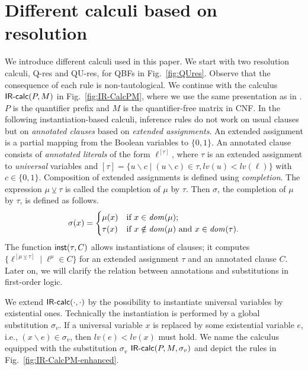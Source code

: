 \documentclass{llncs}
\newcommand{\qres}{\mbox{\sf Q-res}}
\newcommand{\qures}{\mbox{\sf QU-res}}
\newcommand{\IRcalcPM}[2]{$\mbox{\sf IR-calc}(#1,#2)$}
\newcommand{\IRcalcPMSubst}[3]{$\mbox{\sf IR-calc}(#1,#2,#3)$}
\newcommand{\InstOp}[2]{$\mbox{\sf inst}(#1,#2)$}
\newcommand{\dom}[1]{\ensuremath\mathit{dom}(#1)}
\newcommand{\complassign}{\ensuremath{\veebar}}
\newcommand{\is}{\ensuremath{\backslash}}
\newcommand{\restrict}[1]{\ensuremath{[#1]}}
\newcommand{\level}[1]{{\mathit lv(#1)}}
\begin{document}
\section{Different calculi based on resolution}\label{sec:res-calculi}
We introduce different calculi used in this paper.  We start with two
resolution calculi, \qres{} and \qures, for QBFs in
Fig.~\ref{fig:QUres}.  Observe that the consequence of each 
rule is non-tautological.  We continue with the calculus
\IRcalcPM{P}{M}{} in Fig.~\ref{fig:IR-CalcPM}, where we use the same
presentation as in \cite{DBLP:conf/mfcs/BeyersdorffCJ14}.  $P$ is the
quantifier prefix and $M$ is the quantifier-free matrix in CNF. In 
the following instantiation-based calculi, inference rules do not work
on usual clauses but on \emph{annotated clauses} based on
\emph{extended assignments}. An extended assignment is a
partial mapping from the Boolean variables to $\{0,1\}$. An annotated
clause consists of \emph{annotated literals} of the form
$\ell^{\restrict{\tau}}$, where $\tau$ is an extended assignment to
\emph{universal} variables and $\restrict{\tau} = \{u\is c \mid (u\is
c)\in \tau, \level{u}< \level{\ell}\}$ with $c\in \{0,
1\}$. Composition of extended assignments is defined using
\emph{completion}. The expression $\mu \complassign \tau$ is called
the completion of $\mu$ by $\tau$.  Then $\sigma$, the completion of
$\mu$ by $\tau$, is defined as follows.
\begin{equation}\label{eqn:completion}
\sigma(x) = 
\begin{cases}
\mu(x)  & \text{if $x\in \dom{\mu}$};\\
\tau(x) & \text{if $x\notin \dom{\mu}$ and $x\in \dom{\tau}$}.
\end{cases}
\end{equation}
The function \InstOp{\tau}{C} allows instantiations of clauses; it
computes $\{\ell^{\restrict{\mu \complassign \tau}} \mid \ell^{\mu} \in C \}$ 
for an extended assignment $\tau$ and an annotated clause $C$.
Later on, we will clarify the
relation between annotations and substitutions in first-order logic.


We extend \IRcalcPM{\cdot}{\cdot}{} by the possibility to instantiate
universal variables by existential ones.  Technically the
instantiation is performed by a global substitution $\sigma_v$.  If a
universal variable $x$ is replaced by some existential variable $e$,
i.e., $(x\is e) \in \sigma_v$, then $\level{e}<\level{x}$ must
hold. We name the calculus equipped with the substitution $\sigma_v$
\IRcalcPMSubst{P}{M}{\sigma_v} and depict the rules in
Fig.~\ref{fig:IR-CalcPM-enhanced}.
\end{document}
